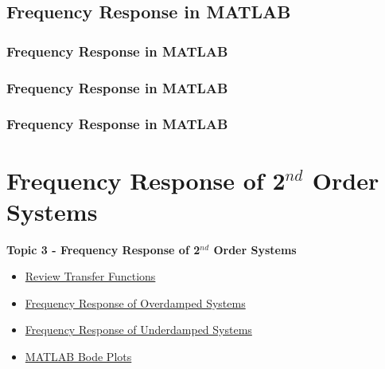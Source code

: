 \documentclass[fleqn]{beamer} %
\newcommand{\sectionIIItitle}{Frequency Response of 2$^{nd}$ Order Systems}
\newcommand{\sectionIIsubsectionIVtitle}{Frequency Response in MATLAB}
\newcommand{\sectionIIIsubsectionItitle}{Review Transfer Functions}
\newcommand{\sectionIIIsubsectionIItitle}{Frequency Response of Overdamped Systems}
\newcommand{\sectionIIIsubsectionIIItitle}{Frequency Response of Underdamped Systems}
\newcommand{\sectionIIIsubsectionIVtitle}{MATLAB Bode Plots}
\begin{document}
			
		\subsection{\sectionIIsubsectionIVtitle}\label{sectionIIsubsectionIV}

			\begin{frame}
				\frametitle{\sectionIIsubsectionIVtitle}
				\bigskip
				

				\btVFill 
			\end{frame}	

			\begin{frame}
				\frametitle{\sectionIIsubsectionIVtitle}
				\bigskip
				

				\btVFill 
			\end{frame}	

			\begin{frame}
				\frametitle{\sectionIIsubsectionIVtitle}
				\bigskip
			

				\btVFill 
			\end{frame}	


		
	\section{\sectionIIItitle}\label{sectionIII}

		\begin{frame}
			\large \textbf{Topic 3 - \sectionIIItitle} \vspace{3mm}\\

			\begin{itemize}
				\item \hyperlink{sectionIIIsubsectionI}{\sectionIIIsubsectionItitle} \vspc %
				\item \hyperlink{sectionIIIsubsectionII}{\sectionIIIsubsectionIItitle} \vspc %
				\item \hyperlink{sectionIIIsubsectionIII}{\sectionIIIsubsectionIIItitle} \vspc %
				\item \hyperlink{sectionIIIsubsectionIV}{\sectionIIIsubsectionIVtitle} \vspc %
			\end{itemize}

		\end{frame}
\end{document}
